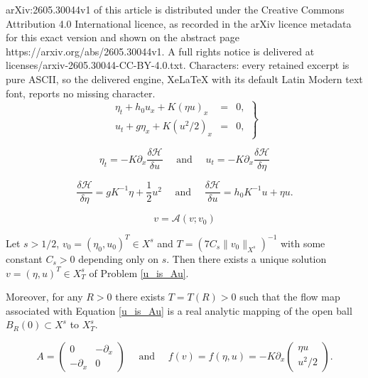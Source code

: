 \documentclass[10pt,a4paper]{amsart}
\begin{document}
arXiv:2605.30044v1 of this article is distributed under the Creative Commons Attribution 4.0 International licence, as recorded in the arXiv licence metadata for this exact version and shown on the abstract page https://arxiv.org/abs/2605.30044v1. A full rights notice is delivered at licenses/arxiv-2605.30044-CC-BY-4.0.txt. Characters: every retained excerpt is pure ASCII, so the delivered engine, XeLaTeX with its default Latin Modern text font, reports no missing character.
\begin{equation}
\label{regularizedSW}
	\left.
	\begin{array}{rcl}
		\eta_t + h_0 u_x  + K ( \eta u )_x
		& = &
		0
		, \\
		u_t + g \eta_x + K ( u^2/2 )_x
		& = &
		0
		,
	\end{array}
	\right\}
\end{equation}

\begin{equation}
\label{Hamiltonian_structure}
    \eta_t
    =
    - K \partial_x
    \frac{\delta \mathcal H}{\delta u}
    \quad
    \text{ and }
    \quad
    u_t
    =
    - K \partial_x
    \frac{\delta \mathcal H}{\delta \eta}
\end{equation}

\begin{equation}
\label{variational_derivatives}
    \frac{\delta \mathcal H}{\delta \eta}
    =
    g K^{-1} \eta
	+
    \frac 12 u^2
    \quad
    \text{ and }
    \quad
    \frac{\delta \mathcal H}{\delta u}
    =
    h_0 K^{-1} u
    +
    \eta u
    .
\end{equation}

\begin{equation}
\label{u_is_Au}
	 v = \mathcal A(v; v_0)
\end{equation}

\begin{lemma}
\label{local_well_posedness_lemma}
	Let $s > 1/2$, $v_0 = (\eta_0, u_0)^T \in X^s$
	and $T = ( 7C_s \lVert v_0 \rVert_{X^s} )^{-1}$
	with some constant $C_s > 0$ depending only on $s$.
	Then there exists a unique solution
	$v = (\eta, u)^T \in X^s_T$ of Problem \eqref{u_is_Au}.


	Moreover, for any $R > 0$ there exists $T = T(R) > 0$
	such that the flow map associated with Equation \eqref{u_is_Au}
	is a real analytic mapping of the open ball
	$B_R(0) \subset X^s$ to $X^s_T$.
\end{lemma}

\begin{equation}
\label{A_and_f_definition}
    A
    =
    \begin{pmatrix}
        0
        &
        -\partial_x
        \\
        -\partial_x
        &
        0
    \end{pmatrix}
    \quad
    \text{ and }
    \quad
    f(v)
    =
    f(\eta, u)
    =
	-
    K \partial_x
	\begin{pmatrix}
		\eta u
		\\
		u^2 / 2
	\end{pmatrix}
    .
\end{equation}
\end{document}
